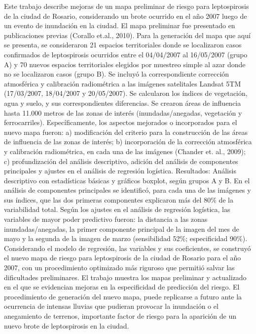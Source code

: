 {Este trabajo describe mejoras de un mapa preliminar de riesgo para leptospirosis de la ciudad de Rosario, considerando un brote ocurrido en el año 2007 luego de un evento de inundación en la ciudad. El mapa preliminar fue presentado en publicaciones previas (Corallo et.al., 2010). Para la generación del mapa que aquí se presenta, se consideraron 21 espacios territoriales donde se localizaron casos confirmados de leptospirosis ocurridos entre el 04/04/2007 al 16/05/2007 (grupo A) y 70 nuevos espacios territoriales elegidos por muestreo simple al azar donde no se localizaron casos (grupo B). Se incluyó la correspondiente corrección atmosférica y calibración radiométrica a las imágenes satelitales Landsat 5TM (17/03/2007, 18/04/2007 y 20/05/2007). Se calcularon los índices de vegetación, agua y suelo, y sus correspondientes diferencias. Se crearon áreas de influencia hasta 11.000 metros de las zonas de interés (inundadas/anegadas, vegetación y ferrocarriles). Específicamente, los aspectos mejorados o incorporados para el nuevo mapa fueron: a) modificación del criterio para la construcción de las áreas de influencia de las zonas de interés; b) incorporación de la corrección atmosférica y calibración radiométrica, en cada una de las imágenes (Chander et. al., 2009); c) profundización del análisis descriptivo, adición del análisis de componentes principales y ajustes en el análisis de regresión logística. Resultados: Análisis descriptivo con estadísticas básicas y gráficos boxplot, según grupos A y B. En el análisis de componentes principales se identificó, para cada una de las imágenes y sus índices, que las dos primeras componentes explicaron más del 80\% de la variabilidad total. Según los ajustes en el análisis de regresión logística, las variables de mayor poder predictivo fueron: la distancia a las zonas inundadas/anegadas, la primer componente principal de la imagen del mes de mayo y la segunda de la imagen de marzo (sensibilidad 52\%; especificidad 90\%). Considerando el modelo de regresión, las variables y sus coeficientes, se construyó el nuevo mapa de riesgo para leptospirosis de la ciudad de Rosario para el año 2007, con un procedimiento optimizado más riguroso que permitió salvar las dificultades preliminares. El trabajo muestra los mapas preliminar y actualizado en el que se evidencian mejoras en la especificidad de predicción del riesgo. El procedimiento de generación del nuevo mapa, puede replicarse a futuro ante la ocurrencia de intensas lluvias que pudieran provocar la inundación o el anegamiento de terrenos, importante factor de riesgo para la aparición de un nuevo brote de leptospirosis en la ciudad.}
